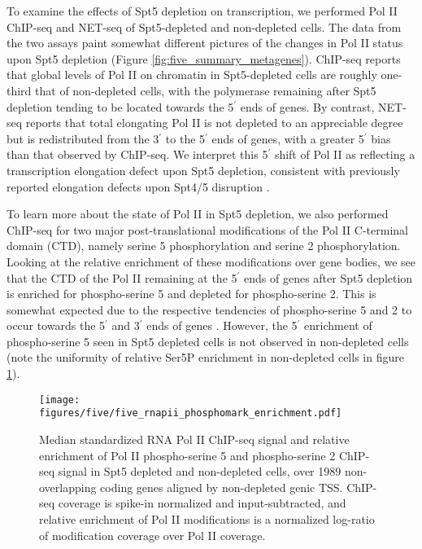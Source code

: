 To examine the effects of Spt5 depletion on transcription, we performed Pol II ChIP-seq and NET-seq of Spt5-depleted and non-depleted cells.
The data from the two assays paint somewhat different pictures of the changes in Pol II status upon Spt5 depletion (Figure \ref{fig:five_summary_metagenes}).
ChIP-seq reports that global levels of Pol II on chromatin in Spt5-depleted cells are roughly one-third that of non-depleted cells, with the polymerase remaining after Spt5 depletion tending to be located towards the 5$^\prime$ ends of genes.
By contrast, NET-seq reports that total elongating Pol II is not depleted to an appreciable degree but is redistributed from the 3$^\prime$ to the 5$^\prime$ ends of genes, with a greater 5$^\prime$ bias than that observed by ChIP-seq.
We interpret this 5$^\prime$ shift of Pol II as reflecting a transcription elongation defect upon Spt5 depletion, consistent with previously reported elongation defects upon Spt4/5 disruption \citep{diamant2016,kramer2016,liu2012,mason2005,morillon2003,quan2010,rondon2003}.

To learn more about the state of Pol II in Spt5 depletion, we also performed ChIP-seq for two major post-translational modifications of the Pol II C-terminal domain (CTD), namely serine 5 phosphorylation and serine 2 phosphorylation.
Looking at the relative enrichment of these modifications over gene bodies, we see that the CTD of the Pol II remaining at the 5$^\prime$ ends of genes after Spt5 depletion is enriched for phospho-serine 5 and depleted for phospho-serine 2.
This is somewhat expected due to the respective tendencies of phospho-serine 5 and 2 to occur towards the 5$^\prime$ and 3$^\prime$ ends of genes \citep{komarnitsky2000}.
However, the 5$^\prime$ enrichment of phospho-serine 5 seen in Spt5 depleted cells is not observed in non-depleted cells (note the uniformity of relative Ser5P enrichment in non-depleted cells in figure \ref{fig:five_rnapii_phosphomark_enrichment}).

\begin{figure}
    \texttt{[image: figures/five/five\_rnapii\_phosphomark\_enrichment.pdf]}
    \caption[Enrichment of RNA Pol II phospho-serine 5 and phospho-serine 2 over non-overlapping coding genes, in Spt5 depleted and non-depleted cells.]{Median standardized RNA Pol II ChIP-seq signal and relative enrichment of Pol II phospho-serine 5 and phospho-serine 2 ChIP-seq signal in Spt5 depleted and non-depleted cells, over 1989 non-overlapping coding genes aligned by non-depleted genic TSS. ChIP-seq coverage is spike-in normalized and input-subtracted, and relative enrichment of Pol II modifications is a normalized log-ratio of modification coverage over Pol II coverage.}
    \label{fig:five_rnapii_phosphomark_enrichment}
\end{figure}


